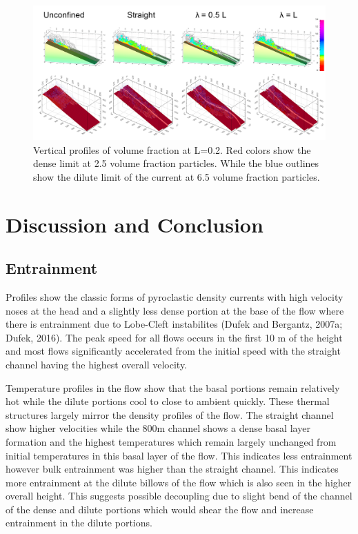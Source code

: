 \label{sec:res}
\begin{figure}[ht]
 \centering
 \includegraphics[width= \linewidth]{simulations_24.png}
 \caption{ Vertical profiles of volume fraction at L=0.2. Red colors show the dense limit at 2.5 volume fraction particles. While the blue outlines show the dilute limit of the current at 6.5 volume fraction particles. }
 \label{fig:sim} 
\end{figure}


\section{Discussion and Conclusion}
\label{sec:dis}
\subsection{Entrainment}
Profiles show the classic forms of pyroclastic density currents with high velocity noses at the head and a slightly less dense portion at the base of the flow where there is entrainment due to Lobe-Cleft instabilites (Dufek and Bergantz, 2007a; Dufek, 2016). The peak speed for all flows occurs in the first 10 m of the height and most flows significantly accelerated from the initial speed with the straight channel having the highest overall velocity. 

Temperature profiles in the flow show that the basal portions remain relatively hot while the dilute portions cool to close to ambient quickly. These thermal structures largely mirror the density profiles of the flow. The straight channel show higher velocities while the 800m channel shows a dense basal layer formation and the highest temperatures which remain largely unchanged from initial temperatures in this basal layer of the flow. This indicates less entrainment however bulk entrainment was higher than the straight channel. This indicates more entrainment at the dilute billows of the flow which is also seen in the higher overall height. This suggests possible decoupling due to slight bend of the channel of the dense and dilute portions which would shear the flow and increase entrainment in the dilute portions. 

